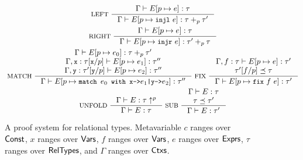 \begin{figure}
\begin{gather*}
    \inference[ LEFT ]{
      \Gamma \judges \upd{E}{p}{ e } : \tau }{
      \Gamma \judges \upd{E}{p}{ \injl\ e} : \tau +_p \tau' } \\
    \inference[ RIGHT ]{
      \Gamma \judges \upd{E}{p}{ e } : \tau }{
      \Gamma \judges \upd{E}{p}{ \injr\ e} : \tau' +_p \tau } \\
    \inference[ MATCH ]{
      \Gamma \judges \upd{E}{p}{e_0} : \tau +_p \tau' \\
      \Gamma, \cc{x} : \replace{ \tau }{p}{ \cc{x} } \judges %
      \upd{E}{p}{e_1} : \tau'' \\
      \Gamma, \cc{y} : \replace{ \tau' }{p}{ \cc{y} } \judges %
      \upd{E}{p}{e_2} : \tau'' }{
      \Gamma \judges %
      \upd{E}{p}{ \matchexp{e_0}{\cc{x}}{e_1}{\cc{y}}{e_2} } : %
      \tau''
    }
    \inference[ FIX ]{
      \Gamma, f : \tau \judges \upd{ E }{ p }{ e } : \tau' \\
      \replace{ \tau' }{ p }{ f } \subtype \tau
    }{ %
      \Gamma \judges \upd{ E }{ p }{ \fix{f}{e} }: \tau' } \\
    \inference[ UNFOLD ]{
      \Gamma \judges E : \unfold{\tau}{p} }{ 
      \Gamma \judges E : \tau }
    \inference[ SUB ]{
      \Gamma \judges E : \tau \\
      \tau \subtype \tau' }{ %
      \Gamma \judges E : \tau' }
  \end{gather*}
  \caption{A proof system for relational types.
    Metavariable $c$ ranges over $\mathsf{Const}$, %
    $x$ ranges over $\mathsf{Vars}$, %
    $f$ ranges over $\mathsf{Vars}$, %
    $e$ ranges over $\mathsf{Exprs}$, %
    $\tau$ ranges over $\mathsf{RelTypes}$, and %
    $\Gamma$ ranges over $\mathsf{Ctxs}$. }
  \label{fig:reltypes-rules}
\end{figure}


